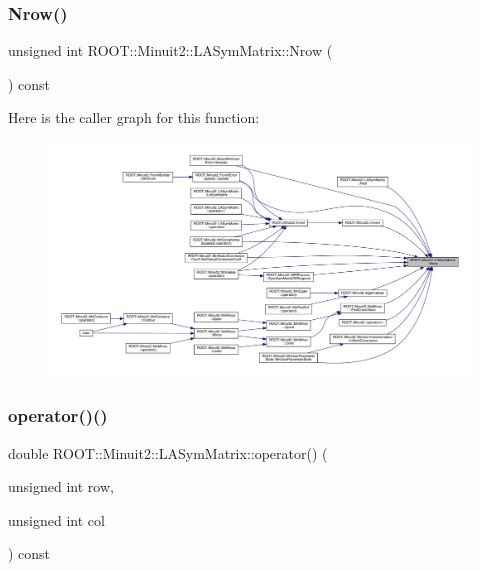 \mbox{\label{classROOT_1_1Minuit2_1_1LASymMatrix_ac76b44933bc4b144b8671c089b8d7ef5}} 
\subsubsection{\texorpdfstring{Nrow()}{Nrow()}\hspace{0.1cm}{\footnotesize\ttfamily [3/3]}}
{\footnotesize\ttfamily unsigned int R\+O\+O\+T\+::\+Minuit2\+::\+L\+A\+Sym\+Matrix\+::\+Nrow (\begin{DoxyParamCaption}{ }\end{DoxyParamCaption}) const\hspace{0.3cm}{\ttfamily [inline]}}

Here is the caller graph for this function\+:
\nopagebreak
\begin{figure}[H]
\begin{center}
\leavevmode
\includegraphics[width=350pt]{d3/d72/classROOT_1_1Minuit2_1_1LASymMatrix_ac76b44933bc4b144b8671c089b8d7ef5_icgraph}
\end{center}
\end{figure}
\mbox{\label{classROOT_1_1Minuit2_1_1LASymMatrix_a3a1a954a9e1ab78f255146ccd76d3847}} 
\subsubsection{\texorpdfstring{operator()()}{operator()()}\hspace{0.1cm}{\footnotesize\ttfamily [1/6]}}
{\footnotesize\ttfamily double R\+O\+O\+T\+::\+Minuit2\+::\+L\+A\+Sym\+Matrix\+::operator() (\begin{DoxyParamCaption}\item[{unsigned int}]{row,  }\item[{unsigned int}]{col }\end{DoxyParamCaption}) const\hspace{0.3cm}{\ttfamily [inline]}}

